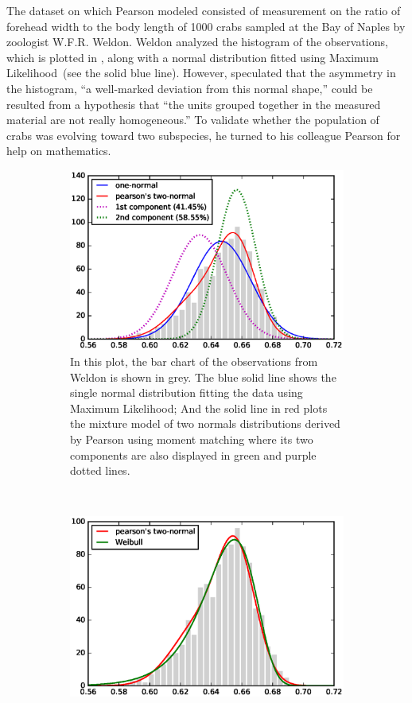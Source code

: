The dataset on which Pearson modeled consisted of measurement on the ratio of
forehead width to the body length of 1000 crabs sampled at the Bay of Naples by
zoologist W.F.R. Weldon. Weldon analyzed the histogram of the observations,
which is plotted in , along with a normal
distribution fitted using Maximum Likelihood~(see the solid blue line). However,
\citet{weldon1893certain} speculated that the asymmetry in the histogram, ``a
well-marked deviation from this normal shape,'' could be resulted from a
hypothesis that ``the units grouped together in the measured material are not
really homogeneous.'' To validate whether the population of crabs was evolving
toward two subspecies, he turned to his colleague Pearson for help on
mathematics.

\begin{figure}[ht!]
  \centering
  \begin{subfigure}[b]{0.95\textwidth}
  \centering
  \includegraphics[width=0.8\linewidth]{figures/pearson-crab.eps}
  \caption{In this plot, the bar chart of the observations from Weldon is shown
    in grey. The blue solid line shows the single normal distribution fitting
    the data using Maximum Likelihood; And the solid line in red plots the
    mixture model of two normals distributions derived by Pearson using moment
    matching where its two components are also displayed in green and purple
    dotted lines.}
  \label{fig::pearson-crab}
  \end{subfigure}
  ~
  \begin{subfigure}[b]{0.95\textwidth}
  \centering
  \includegraphics[width=0.8\linewidth]{figures/pearson-crab-weibull.eps}

\end{subfigure}
\end{figure}
